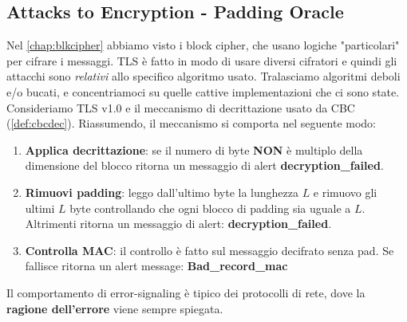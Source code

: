 \subsection{Attacks to Encryption - Padding Oracle}
Nel \cref{chap:blkcipher} abbiamo visto i block cipher, che usano logiche "particolari" per cifrare i messaggi. TLS è fatto in modo di usare diversi cifratori e quindi gli attacchi sono \textit{relativi} allo specifico algoritmo usato. Tralasciamo algoritmi deboli e/o bucati, e concentriamoci su quelle cattive implementazioni che ci sono state.\\
Consideriamo TLS v1.0 e il meccanismo di decrittazione usato da CBC (\cref{def:cbcdec}). Riassumendo, il meccanismo si comporta nel seguente modo:
\begin{enumerate}
    \item \textbf{Applica decrittazione}: se il numero di byte \textbf{NON} è multiplo della dimensione del blocco ritorna un messaggio di alert \textbf{decryption\_failed}.
    \item \textbf{Rimuovi padding}: leggo dall'ultimo byte la lunghezza $L$ e rimuovo gli ultimi $L$ byte controllando che ogni blocco di padding sia uguale a $L$. Altrimenti ritorna un messaggio di alert: \textbf{decryption\_failed}.
    \item \textbf{Controlla MAC}: il controllo è fatto sul messaggio decifrato senza pad. Se fallisce ritorna un alert message: \textbf{Bad\_record\_mac}
\end{enumerate}
\begin{remark}
Il comportamento di error-signaling è tipico dei protocolli di rete, dove la \textbf{ragione dell'errore} viene sempre spiegata. 
\end{remark}\pagebreak
